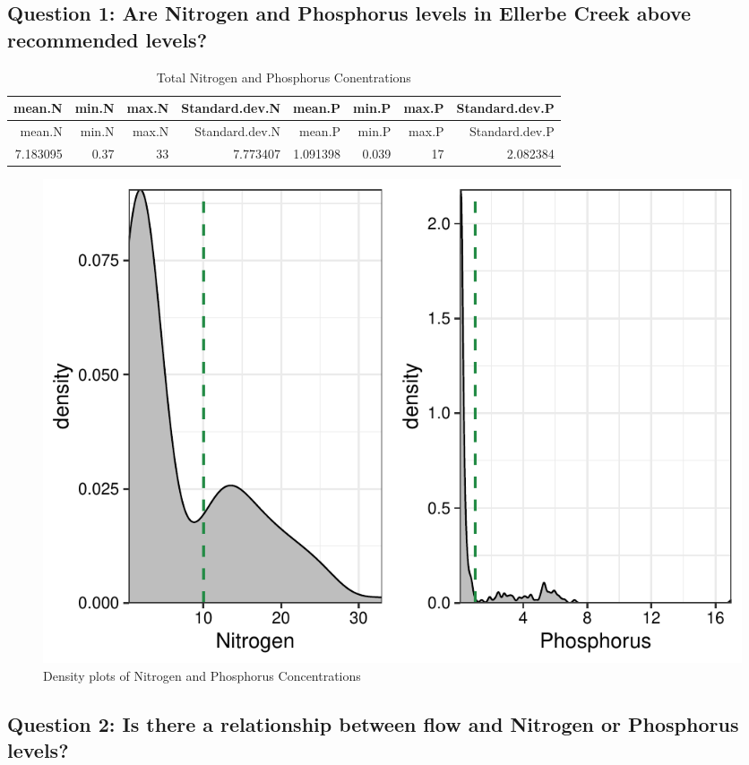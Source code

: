 \documentclass[12pt,]{article}
\begin{document}
\hypertarget{question-1-are-nitrogen-and-phosphorus-levels-in-ellerbe-creek-above-recommended-levels}{%
\subsection{Question 1: Are Nitrogen and Phosphorus levels in Ellerbe
Creek above recommended
levels?}\label{question-1-are-nitrogen-and-phosphorus-levels-in-ellerbe-creek-above-recommended-levels}}

\begin{longtable}[]{@{}rrrrrrrr@{}}
\caption{Total Nitrogen and Phosphorus Conentrations}\tabularnewline
\toprule
mean.N & min.N & max.N & Standard.dev.N & mean.P & min.P & max.P &
Standard.dev.P\tabularnewline
\midrule
\endfirsthead
\toprule
mean.N & min.N & max.N & Standard.dev.N & mean.P & min.P & max.P &
Standard.dev.P\tabularnewline
\midrule
\endhead
7.183095 & 0.37 & 33 & 7.773407 & 1.091398 & 0.039 & 17 &
2.082384\tabularnewline
\bottomrule
\end{longtable}

\newpage

\begin{figure}
\centering
\includegraphics{Landman_ENV872_Project_files/figure-latex/Data Analysis Figure 6-1.pdf}
\caption{Density plots of Nitrogen and Phosphorus Concentrations}
\end{figure}

\newpage

\hypertarget{question-2-is-there-a-relationship-between-flow-and-nitrogen-or-phosphorus-levels}{%
\subsection{Question 2: Is there a relationship between flow and
Nitrogen or Phosphorus
levels?}\label{question-2-is-there-a-relationship-between-flow-and-nitrogen-or-phosphorus-levels}}
\end{document}
